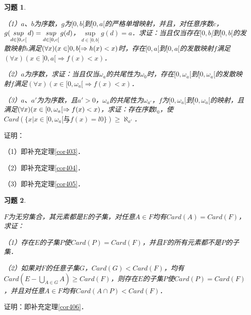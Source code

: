 \documentclass[12pt, a4paper, oneside]{book}
\newtheorem{exer}{习题}
\begin{document}
			\begin{exer}\label{exer178}
				\hfill\par
				（1）$a$、$b$为序数，$g$为$[0, b[$到$[0, a[$的严格单增映射，并且，对任意序数$c$，$g(\mathop{sup}\limits_{d\in [0, c[}d)\\=\mathop{sup}\limits_{d\in [0, c[}g(d)$，$\mathop{sup}\limits_{d\in [0, b[}g(d)=a$．求证：当且仅当存在$[0, b$[到$[0, b[$的发散映射$h$满足$(\forall x)\\(x\in ]0, b[\Rightarrow h(x)<x)$时，存在$[0, a[$到$[0, a[$的发散映射$f$满足$(\forall x)(x\in ]0, a[\Rightarrow f(x)<x)$．
				\par
				（2）$a$为序数，求证：当且仅当$\omega_a$的共尾性为$\omega_0$时，存在$[0, \omega_a[$到$[0, \omega_a[$的发散映射$f$满足$(\forall x)(x\in [0, \omega_a[\Rightarrow f(x)<x)$．
				\par
				（3）$a$、$a'$为为序数，且$a'>0$，$\omega_a$的共尾性为$\omega_{a'}$，$f$为$[0, \omega_a[$到$[0, \omega_a[$的映射，且满足$(\forall x)\\(x\in [0, \omega_a[\Rightarrow f(x)<x)$，求证：存在序数$l_0$，使$Card(\{x|x\in [0, \omega_a[\text{与}f(x)=l0\})\geq \aleph_{a'}$．
			\end{exer}
			证明：
			\par
			（1）即补充定理\ref{cor403}．
			\par
			（2）即补充定理\ref{cor404}．
			\par
			（3）即补充定理\ref{cor405}．
			
			\begin{exer}\label{exer179}
				\hfill\par
				$F$为无穷集合，其元素都是$E$的子集，对任意$A\in F$均有$Card(A)=Card(F)$，求证：
				\par
				（1）存在$E$的子集$P$使$Card(P)=Card(F)$，并且$F$的所有元素都不是$P$的子集．
				\par
				（2）如果对$F$的任意子集$G$，$Card(G)<Card(F)$，均有$Card(E-\bigcup\limits_{A\in G}A)\geq Card(F)$，则存在$E$的子集$P$使$Card(P)=Card(F)$，并且对任意$A\in F$均有$Card(A\cap P)<Card(F)$．
			\end{exer}
			证明：即补充定理\ref{cor406}．
			
\end{document}
